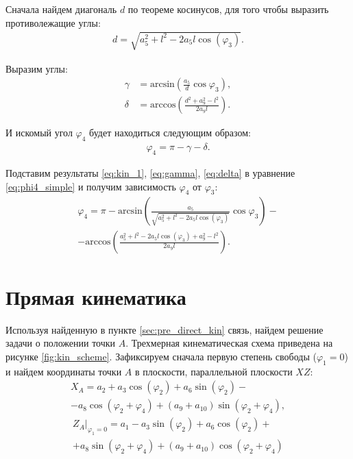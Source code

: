 Сначала найдем диагональ $d$ по теореме косинусов, для того чтобы выразить противолежащие углы:
\begin{align}
    d = \sqrt{a_5^2 + l^2 - 2a_5 l \cos(\varphi_3)}. \label{eq:kin_1}
\end{align}

\noindent Выразим углы:
\begin{align}
    \gamma &= \text{arcsin}\left(\frac{a_5}{d}\cos \varphi_3\right) \label{eq:gamma}, \\
    \delta &= \text{arccos}\left(\frac{d^2+a_9^2-l^2}{2 a_9 l}\right). \label{eq:delta}
\end{align}

\noindent И искомый угол $ \varphi_4 $ будет находиться следующим образом:
\begin{align}
    \varphi_4 = \pi - \gamma - \delta. \label{eq:phi4_simple}
\end{align}

\noindent Подставим результаты \ref{eq:kin_1}, \ref{eq:gamma}, \ref{eq:delta} в уравнение \ref{eq:phi4_simple} и получим зависимость $ \varphi_4 $ от $ \varphi_3 $:
\begin{multline}
    \varphi_4 = \pi - \text{arcsin}\left(\frac{a_5}{\sqrt{a_5^2 + l^2 - 2a_5 l \cos(\varphi_3)}}\cos \varphi_3\right) - \\ - \text{arccos}\left(\frac{a_5^2 + l^2 - 2a_5 l \cos(\varphi_3)+a_9^2-l^2}{2 a_9 l}\right) .
\end{multline}

\section{Прямая кинематика}\label{sec:direct_kinematics}
Используя найденную в пункте \ref{sec:pre_direct_kin} связь, найдем решение задачи о положении точки $ A $. Трехмерная кинематическая схема приведена на рисунке \ref{fig:kin_scheme}. Зафиксируем сначала первую степень свободы ($ \varphi_1 = 0 $) и найдем координаты точки $ A $ в плоскости, параллельной плоскости $ XZ $:
\begin{multline}
    X_A=a_2+a_3\cos(\varphi_2)+a_6\sin(\varphi_2)-\\-a_8 \cos(\varphi _2+\varphi _4)+(a_9+a_{10}) \sin(\varphi _2+\varphi _4) ,
\end{multline}
\begin{multline} %
    Z_A\Bigr|_{\varphi_1=0} =a_1-a_3 \sin(\varphi _2)+a_6 \cos(\varphi _2)+\\+a_8 \sin(\varphi _2+\varphi _4)+(a_9+a_{10}) \cos(\varphi _2+\varphi _4)
\end{multline}

